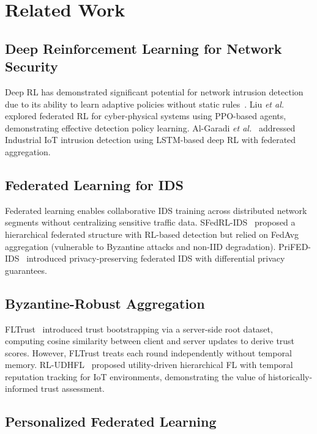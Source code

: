 \documentclass[conference]{IEEEtran}
\begin{document}
\section{Related Work}
\label{sec:related}

\subsection{Deep Reinforcement Learning for Network Security}

Deep RL has demonstrated significant potential for network intrusion detection due to its ability to learn adaptive policies without static rules~\cite{rlintro}. Liu \textit{et al.}~\cite{fedrl_adaptive} explored federated RL for cyber-physical systems using PPO-based agents, demonstrating effective detection policy learning. Al-Garadi \textit{et al.}~\cite{drl_iiot} addressed Industrial IoT intrusion detection using LSTM-based deep RL with federated aggregation.

\subsection{Federated Learning for IDS}

Federated learning enables collaborative IDS training across distributed network segments without centralizing sensitive traffic data. SFedRL-IDS~\cite{sfedrl} proposed a hierarchical federated structure with RL-based detection but relied on FedAvg aggregation (vulnerable to Byzantine attacks and non-IID degradation). PriFED-IDS~\cite{prifeds} introduced privacy-preserving federated IDS with differential privacy guarantees.

\subsection{Byzantine-Robust Aggregation}

FLTrust~\cite{fltrust} introduced trust bootstrapping via a server-side root dataset, computing cosine similarity between client and server updates to derive trust scores. However, FLTrust treats each round independently without temporal memory. RL-UDHFL~\cite{rludhfl} proposed utility-driven hierarchical FL with temporal reputation tracking for IoT environments, demonstrating the value of historically-informed trust assessment.

\subsection{Personalized Federated Learning}
\end{document}
